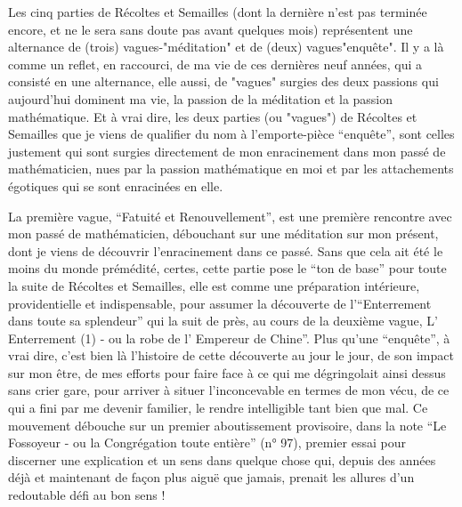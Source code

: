 Les cinq parties de Récoltes et Semailles (dont la dernière n'est pas terminée encore, et ne le sera sans doute pas avant quelques mois) représentent une alternance de (trois) vagues-"méditation" et de (deux) vagues"enquête". Il y a là comme un reflet, en raccourci, de ma vie de ces dernières neuf années, qui a consisté en une alternance, elle aussi, de "vagues" surgies des deux passions qui aujourd'hui dominent ma vie, la passion de la méditation et la passion mathématique. Et à vrai dire, les deux parties (ou "vagues") de Récoltes et Semailles que je viens de qualifier du nom à l'emporte-pièce ``enquête'', sont celles justement qui sont surgies directement de mon enracinement dans mon passé de mathématicien, nues par la passion mathématique en moi et par les attachements égotiques qui se sont enracinées en elle.

La première vague, ``Fatuité et Renouvellement'', est une première rencontre avec mon passé de mathématicien, débouchant sur une méditation sur mon présent, dont je viens de découvrir l'enracinement dans ce passé. Sans que cela ait été le moins du monde prémédité, certes, cette partie pose le ``ton de base'' pour toute la suite de Récoltes et Semailles, elle est comme une préparation intérieure, providentielle et indispensable, pour assumer la découverte de l'``Enterrement dans toute sa splendeur'' qui la suit de près, au cours de la deuxième vague, L' Enterrement (1) - ou la robe de l' Empereur de Chine''. Plus qu'une ``enquête'', à vrai dire, c'est bien là l'histoire de cette découverte au jour le jour, de son impact sur mon être, de mes efforts pour faire face à ce qui me dégringolait ainsi dessus sans crier gare, pour arriver à situer l'inconcevable en termes de mon vécu, de ce qui a fini par me devenir familier, le rendre intelligible tant bien que mal. Ce mouvement débouche sur un premier aboutissement provisoire, dans la note ``Le Fossoyeur - ou la Congrégation toute entière'' (n° 97), premier essai pour discerner une explication et un sens dans quelque chose qui, depuis des années déjà et maintenant de façon plus aiguë que jamais, prenait les allures d'un redoutable défi au bon sens !

